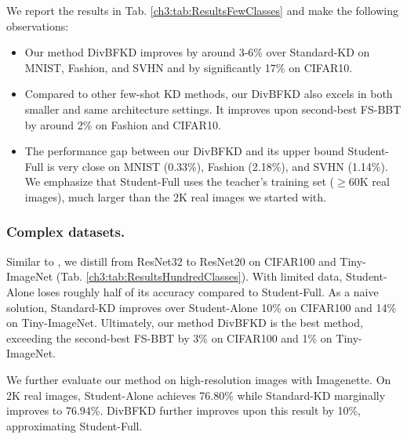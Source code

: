 \begin{foldable}
We report the results in Tab. \ref{ch3:tab:ResultsFewClasses} and make the following observations:
\begin{itemize}
    \item Our method DivBFKD improves by around 3-6\% over Standard-KD on MNIST, Fashion, and SVHN and by significantly 17\% on CIFAR10.
    \item Compared to other few-shot KD methods, our DivBFKD also excels in both smaller and same architecture settings. It improves upon second-best FS-BBT by around 2\% on Fashion and CIFAR10.
    \item The performance gap between our DivBFKD and its upper bound Student-Full is very close on MNIST (0.33\%), Fashion (2.18\%), and SVHN (1.14\%). We emphasize that Student-Full uses the teacher's training set ($\ge$60K real images), much larger than the 2K real images we started with.
\end{itemize}
\end{foldable}


\subsubsection{Complex datasets.}
\begin{foldable}
Similar to \cite{wang2020neural,nguyen2022black,kong2020learning}, we distill from ResNet32 to ResNet20 on CIFAR100 and Tiny-ImageNet (Tab. \ref{ch3:tab:ResultsHundredClasses}).
With limited data, Student-Alone loses roughly half of its accuracy compared to Student-Full.
As a naive solution, Standard-KD improves over Student-Alone 10\% on CIFAR100 and 14\% on Tiny-ImageNet.
Ultimately, our method DivBFKD is the best method, exceeding the second-best FS-BBT by 3\% on CIFAR100 and 1\% on Tiny-ImageNet.
\end{foldable}

\begin{foldable}
We further evaluate our method on high-resolution images with Imagenette.
On 2K real images, Student-Alone achieves 76.80\% while Standard-KD marginally improves to 76.94\%.
DivBFKD further improves upon this result by 10\%, approximating Student-Full.
\end{foldable}

